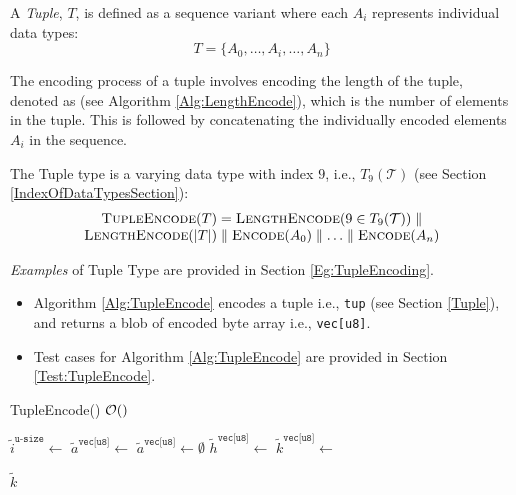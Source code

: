 \documentclass[../alan-handbook.tex]{subfiles}
\begin{document}
A \textit{Tuple}, $T$, is defined as a sequence variant where each $A_i$ represents individual data types:
$$T = \{A_0, \ldots, A_i, \ldots, A_n\}$$

The encoding process of a tuple involves encoding the length of the tuple, denoted as  (see Algorithm \ref{Alg:LengthEncode}), which is the number of elements in the tuple. This is followed by concatenating the individually encoded elements $A_i$ in the sequence.

The Tuple type is a varying data type with index $9$, i.e., $T_9(\mathcal{T})$ (see Section \ref{IndexOfDataTypesSection}):
$$
\begin{matrix}
    \Call{TupleEncode}{T} = \Call{LengthEncode}{9 \in T_9(\mathcal{T})} \parallel \\
    \Call{LengthEncode}{\lvert T \rvert} \parallel \Call{Encode}{A_0} \parallel \ldots \parallel \Call{Encode}{A_n}
\end{matrix}
$$

\textit{Examples} of Tuple Type are provided in Section \ref{Eg:TupleEncoding}.

\label{TupleEncode}

\begin{itemize}
    \item Algorithm \ref{Alg:TupleEncode} encodes a tuple i.e., \texttt{tup} (see Section \ref{Tuple}), and returns a blob of encoded byte array i.e., \texttt{vec[u8]}.
    \item Test cases for Algorithm \ref{Alg:TupleEncode} are provided in Section \ref{Test:TupleEncode}.
\end{itemize}

\begin{algorithm}
\caption{TupleEncode() \hfill $\mathcal{O}()$  }
\label{Alg:TupleEncode}
\begin{algorithmic}[1]
    \State $\tilde{i}^{\texttt{u-size}} \gets$  \Comment{\ref{NumElements}}
        \State $\tilde{a}^{\texttt{vec[u8]}} \gets$ \Comment{\ref{IterateEncodeForSequence}}
    \Else 
        \State $\tilde{a}^{\texttt{vec[u8]}} \gets \emptyset$
    \EndIf
    \State $\tilde{h}^{\texttt{vec[u8]}} \gets$  \Comment{\ref{LengthEncode}}
    \State $\tilde{k}^{\texttt{vec[u8]}} \gets$  \Comment{\ref{ConcatByteArrays}}

    \Return $\tilde{k}$
\EndFunction
\end{algorithmic}
\end{algorithm}
\end{document}
